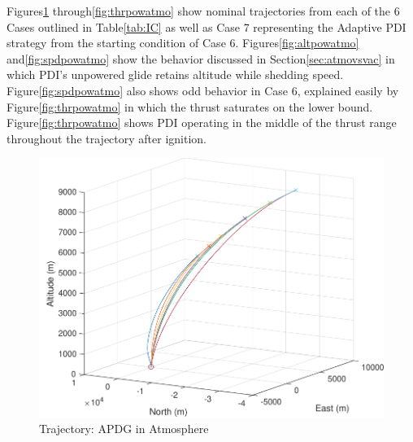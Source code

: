Figures\:\ref{fig:trajpowatmo} through\:\ref{fig:thrpowatmo} show nominal trajectories from each of the 6 Cases outlined in Table\:\ref{tab:IC} as well as Case 7 representing the Adaptive PDI strategy from the starting condition of Case 6. Figures\:\ref{fig:altpowatmo} and\:\ref{fig:spdpowatmo} show the behavior discussed in Section\:\ref{sec:atmovsvac} in which PDI's unpowered glide retains altitude while shedding speed. Figure\:\ref{fig:spdpowatmo} also shows odd behavior in Case 6, explained easily by Figure\:\ref{fig:thrpowatmo} in which the thrust saturates on the lower bound. Figure\:\ref{fig:thrpowatmo} shows PDI operating in the middle of the thrust range throughout the trajectory after ignition.

\begin{figure}[H]
	\centering
	\begin{minipage}{4.3 in}
		\includegraphics[width=\linewidth]{Figures/trajpowatmo.pdf}
		\caption{Trajectory: APDG in Atmosphere \label{fig:trajpowatmo} }
	\end{minipage}
\end{figure}

